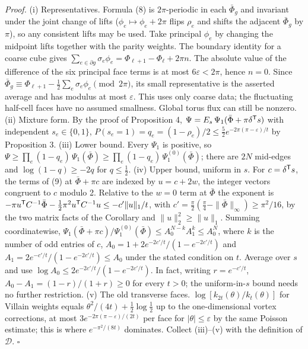 \documentclass[11pt,a4paper]{article}
\begin{document}
\emph{Proof.} (i) Representatives. Formula (8) is \(2\pi\)-periodic in
each \(\bar\Phi_g\) and invariant under the joint change of lifts
(\(\phi_e\mapsto\phi_e+2\pi\) flips \(\rho_e\) and shifts the adjacent
\(\bar\Phi_g\) by \(\pi\)), so any consistent lifts may be used. Take
principal \(\phi_e\) by changing the midpoint lifts together with the
parity weights. The boundary identity for a coarse cube gives
\(\sum_{e\in\partial g}\sigma_e\phi_e=\Phi_{\ell+1}-\Phi_\ell+2\pi n\).
The absolute value of the difference of the six principal face terms is
at most \(6\varepsilon<2\pi\), hence \(n=0\). Since
\(\bar\Phi_g\equiv\Phi_{\ell+1}-\frac12\sum_e\sigma_e\phi_e\pmod{2\pi}\),
its small representative is the asserted average and has modulus at most
\(\varepsilon\). This uses only coarse data; the fluctuating half-cell
faces have no assumed smallness. Global torus flux can still be nonzero.
(ii) Mixture form. By the proof of Proposition 4,
\(\Psi=E_s\,\Psi_1(\bar\Phi+\pi\delta^{\sf T}s)\) with independent
\(s_e\in\{0,1\}\),
\(P(s_e=1)=q_e=(1-\rho_e)/2\le\frac52 e^{-2\pi(\pi-\varepsilon)/t}\) by
Proposition 3. (iii) Lower bound. Every \(\Psi_1\) is positive, so
\(\Psi\ge\prod_e(1-q_e)\,\Psi_1(\bar\Phi)\ge\prod_e(1-q_e)\, \Psi_1^{(0)}(\bar\Phi)\);
there are \(2N\) mid-edges and \(\log(1-q)\ge-2q\) for \(q\le\frac12\).
(iv) Upper bound, uniform in \(s\). For \(c=\delta^{\sf T}s\), the terms
of (9) at \(\bar\Phi+\pi c\) are indexed by \(u=c+2w\), the integer
vectors congruent to \(c\) modulo 2. Relative to the \(w=0\) term at
\(\bar\Phi\) the exponent is
\(-\pi u^{\sf T}C^{-1}\bar\Phi-\frac12\pi^2u^{\sf T}C^{-1}u \le-c'\|u\|_1/t\),
with \(c'=\frac\pi2(\frac\pi4-\|\bar\Phi\|_\infty) \ge\pi^2/16\), by the
two matrix facts of the Corollary and \(\|u\|_2^2\ge\|u\|_1\). Summing
coordinatewise,
\(\Psi_1(\bar\Phi+\pi c)/\Psi_1^{(0)}(\bar\Phi)\le A_0^{N-k}A_1^k\le A_0^N\),
where \(k\) is the number of odd entries of \(c\),
\(A_0=1+2e^{-2c'/t}/(1-e^{-2c'/t})\) and
\(A_1=2e^{-c'/t}/(1-e^{-2c'/t})\le A_0\) under the stated condition on
\(t\). Average over \(s\) and use
\(\log A_0\le2e^{-2c'/t}/(1-e^{-2c'/t})\). In fact, writing
\(r=e^{-c'/t}\), \(A_0-A_1=(1-r)/(1+r)\ge0\) for every \(t>0\); the
uniform-in-\(s\) bound needs no further restriction. (v) The old
transverse faces. \(\log[k_{2t}(\theta)/k_t(\theta)]\) for Villain
weights equals \(\theta^2/(4t)+\frac12\log\frac12\) up to the
one-dimensional vortex corrections, at most
\(3e^{-2\pi(\pi-\varepsilon)/(2t)}\) per face for
\(|\theta|\le\varepsilon\) by the same Poisson estimate; this is where
\(e^{-\pi^2/(8t)}\) dominates. Collect (iii)--(v) with the definition of
\(\mathcal D\). \(\square\)
\end{document}
